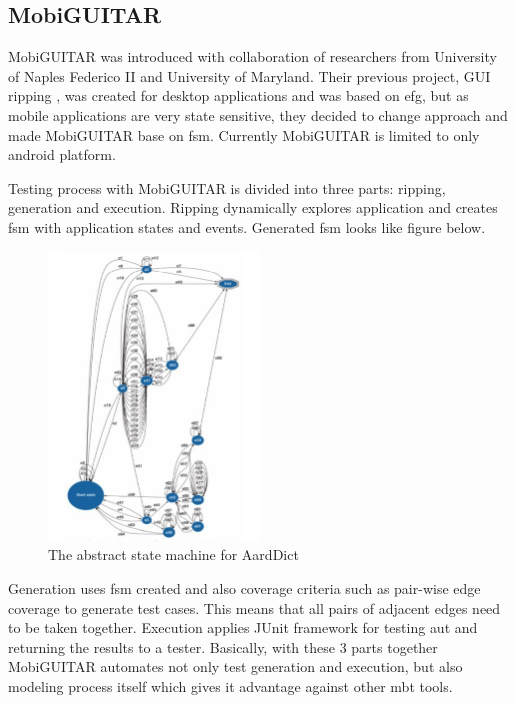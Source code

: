 \subsection{MobiGUITAR}
\par
MobiGUITAR \cite{MobiGUITAR} was introduced with collaboration of researchers from University of Naples Federico II and University of Maryland. Their previous project, GUI ripping \cite{GUIripping}, was created for desktop applications and was based on \acrshort{efg}, but as mobile applications are very state sensitive, they decided to change approach and made MobiGUITAR base on \acrshort{fsm}. Currently MobiGUITAR is limited to only android platform.

\par
Testing process with MobiGUITAR is divided into three parts: ripping, generation and execution. Ripping dynamically explores application and creates \acrshort{fsm} with application states and events. Generated \acrshort{fsm} looks like figure below.

\begin{figure} [htbp!]
	\centering
					\includegraphics[width=0.5\textwidth]{figures/mobiguitar.JPG}
					\caption{\label{Fig:MobiGuitar} The abstract state machine for AardDict\cite{MobiGUITAR}}
\end{figure}

Generation uses \acrshort{fsm} created and also coverage criteria such as pair-wise edge coverage to generate test cases. This means that all pairs of adjacent edges need to be taken together.
Execution applies JUnit framework for testing \acrshort{aut} and returning the results to a tester. Basically, with these 3 parts together MobiGUITAR automates not only test generation and execution, but also modeling process itself which gives it advantage against other \acrshort{mbt} tools.

